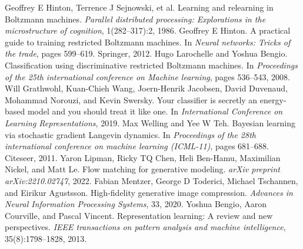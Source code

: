 \begin{chapterreferences}
 Geoffrey E Hinton, Terrence J Sejnowski, et al. Learning and relearning in Boltzmann machines. \emph{Parallel distributed processing: Explorations in the microstructure of cognition}, 1(282–317):2, 1986.
 Geoffrey E Hinton. A practical guide to training restricted Boltzmann machines. In \emph{Neural networks: Tricks of the trade}, pages 599–619. Springer, 2012.
 Hugo Larochelle and Yoshua Bengio. Classification using discriminative restricted Boltzmann machines. In \emph{Proceedings of the 25th international conference on Machine learning}, pages 536–543, 2008.
 Will Grathwohl, Kuan-Chieh Wang, Joern-Henrik Jacobsen, David Duvenaud, Mohammad Norouzi, and Kevin Swersky. Your classifier is secretly an energy-based model and you should treat it like one. In \emph{International Conference on Learning Representations}, 2019.
 Max Welling and Yee W Teh. Bayesian learning via stochastic gradient Langevin dynamics. In \emph{Proceedings of the 28th international conference on machine learning (ICML-11)}, pages 681–688. Citeseer, 2011.
 Yaron Lipman, Ricky TQ Chen, Heli Ben-Hamu, Maximilian Nickel, and Matt Le. Flow matching for generative modeling. \emph{arXiv preprint arXiv:2210.02747}, 2022.
 Fabian Mentzer, George D Toderici, Michael Tschannen, and Eirikur Agustsson. High-fidelity generative image compression. \emph{Advances in Neural Information Processing Systems}, 33, 2020.
 Yoshua Bengio, Aaron Courville, and Pascal Vincent. Representation learning: A review and new perspectives. \emph{IEEE transactions on pattern analysis and machine intelligence}, 35(8):1798–1828, 2013.
\end{chapterreferences}

